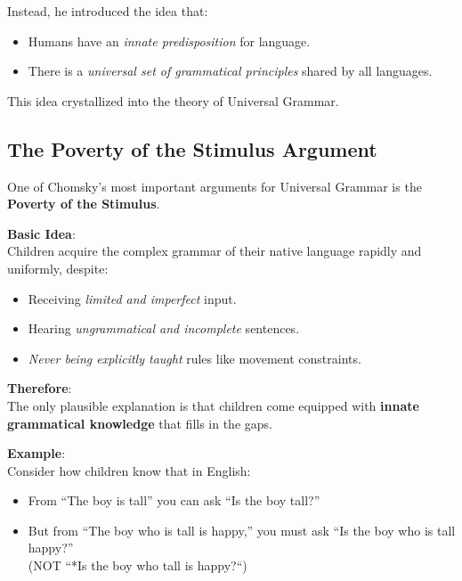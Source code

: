 \documentclass[12pt]{article}
\newcommand{\tightlist}{\itemsep 0pt\parskip 0pt\parsep 0pt}
\begin{document}
Instead, he introduced the idea that:

\begin{itemize}
\tightlist
\item
  Humans have an \emph{innate predisposition} for language.
\item
  There is a \emph{universal set of grammatical principles} shared by
  all languages.
\end{itemize}

This idea crystallized into the theory of Universal Grammar.

\hypertarget{the-poverty-of-the-stimulus-argument}{%
\subsection{The Poverty of the Stimulus
Argument}\label{the-poverty-of-the-stimulus-argument}}

One of Chomsky's most important arguments for Universal Grammar is the
\textbf{Poverty of the Stimulus}.

\textbf{Basic Idea}:\\
Children acquire the complex grammar of their native language rapidly
and uniformly, despite:

\begin{itemize}
\tightlist
\item
  Receiving \emph{limited and imperfect} input.
\item
  Hearing \emph{ungrammatical and incomplete} sentences.
\item
  \emph{Never being explicitly taught} rules like movement constraints.
\end{itemize}

\textbf{Therefore}:\\
The only plausible explanation is that children come equipped with
\textbf{innate grammatical knowledge} that fills in the gaps.

\textbf{Example}:\\
Consider how children know that in English:

\begin{itemize}
\tightlist
\item
  From ``The boy is tall'' you can ask ``Is the boy tall?''
\item
  But from ``The boy who is tall is happy,'' you must ask ``Is the boy
  who is tall happy?''\\
  (NOT ``*Is the boy who tall is happy?{}``)
\end{itemize}
\end{document}
